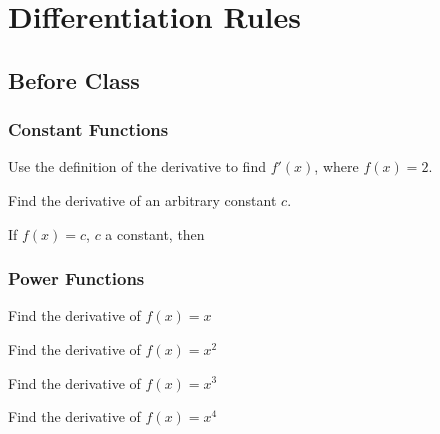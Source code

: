 \documentclass[notes]{subfiles}
\begin{document}
	\fancyhead[LO,RE]{\bfseries \small \currentname}
	\fancyfoot[C]{{}}
	\fancyfoot[LO,RE]{\large \thepage}	%
	
	
\section*{Differentiation Rules}\label{cs33}
	\subsection*{Before Class}
	\subsubsection*{Constant Functions}
		\begin{ex}
			Use the definition of the derivative to find \(f'(x)\), where \(f(x) = 2\).
		\end{ex}
			
		\begin{ex}
			Find the derivative of an arbitrary constant \(c\).
		\end{ex}
			
		\begin{thm}
			If \(f(x) = c\), \(c\) a constant, then 
			
				\vspace{.25in}
			
		\end{thm}
			\newpage
	
	\subsubsection*{Power Functions}	
		\begin{ex}
			Find the derivative of \(f(x) = x\)
		\end{ex}
			
		\begin{ex}
			Find the derivative of \(f(x) = x^2\)
		\end{ex}
			
		\begin{ex}
			Find the derivative of \(f(x) = x^3\)
		\end{ex}
		
		\begin{ex}
			Find the derivative of \(f(x) = x^4\)
		\end{ex}	
			\newpage
			
\end{document}
